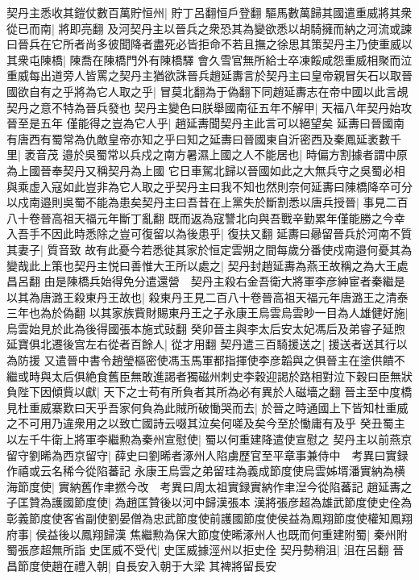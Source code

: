契丹主悉收其鎧仗數百萬貯恒州|{
	貯丁呂翻恒戶登翻}
驅馬數萬歸其國遣重威將其衆從已而南|{
	將即亮翻}
及河契丹主以晉兵之衆恐其為變欲悉以胡騎擁而納之河流或諫曰晉兵在它所者尚多彼聞降者盡死必皆拒命不若且撫之徐思其策契丹主乃使重威以其衆屯陳橋|{
	陳喬在陳橋門外有陳橋驛}
會久雪官無所給士卒凍餒咸怨重威相聚而泣重威每出道旁人皆罵之契丹主猶欲誅晉兵趙延夀言於契丹主曰皇帝親冒矢石以取晉國欲自有之乎將為它人取之乎|{
	冒莫北翻為于偽翻下同趙延夀志在帝中國以此言覘契丹之意不特為晉兵發也}
契丹主變色曰朕舉國南征五年不解甲|{
	天福八年契丹始攻晉至是五年}
僅能得之豈為它人乎|{
	趙延夀聞契丹主此言可以絕望矣}
延夀曰晉國南有唐西有蜀常為仇敵皇帝亦知之乎曰知之延夀曰晉國東自沂密西及秦鳳延袤數千里|{
	袤音茂}
邉於吳蜀常以兵戍之南方暑濕上國之人不能居也|{
	時偏方割據者謂中原為上國晉奉契丹又稱契丹為上國}
它日車駕北歸以晉國如此之大無兵守之吳蜀必相與乘虚入寇如此豈非為它人取之乎契丹主曰我不知也然則奈何延夀曰陳橋降卒可分以戍南邉則吳蜀不能為患矣契丹主曰吾昔在上黨失於斷割悉以唐兵授晉|{
	事見二百八十卷晉高祖天福元年斷丁亂翻}
既而返為寇讐北向與吾戰辛勤累年僅能勝之今幸入吾手不因此時悉除之豈可復留以為後患乎|{
	復扶又翻}
延夀曰曏留晉兵於河南不質其妻子|{
	質音致}
故有此憂今若悉徙其家於恒定雲朔之間每歲分番使戍南邉何憂其為變哉此上策也契丹主悦曰善惟大王所以處之|{
	契丹封趙延夀為燕王故稱之為大王處昌呂翻}
由是陳橋兵始得免分遣還營　契丹主殺右金吾衛大將軍李彦紳宦者秦繼是以其為唐潞王殺東丹王故也|{
	殺東丹王見二百八十卷晉高祖天福元年唐潞王之清泰三年也為於偽翻}
以其家族貲財賜東丹王之子永康王烏雲烏雲眇一目為人雄健好施|{
	烏雲始見於此為後得國張本施式䜴翻}
癸卯晉主與李太后安太妃馮后及弟睿子延煦延寶俱北遷後宫左右從者百餘人|{
	從才用翻}
契丹遣三百騎援送之|{
	援送者送其行以為防援}
又遣晉中書令趙瑩樞密使馮玉馬軍都指揮使李彦韜與之俱晉主在塗供饋不繼或時與太后俱絶食舊臣無敢進謁者獨磁州刺史李穀迎謁於路相對泣下穀曰臣無狀負陛下因傾貲以獻|{
	天下之士苟有所負者其所為必有異於人磁墻之翻}
晉主至中度橋見杜重威寨歎曰天乎吾家何負為此賊所破慟哭而去|{
	於晉之時通國上下皆知杜重威之不可用乃違衆用之以致亡國詩云啜其泣矣何嗟及矣今至於慟庸有及乎}
癸丑蜀主以左千牛衛上將軍李繼勲為秦州宣慰使|{
	蜀以何重建降遣使宣慰之}
契丹主以前燕京留守劉晞為西京留守|{
	薛史曰劉晞者涿州人陷虜歷官至平章事兼侍中　考異曰實録作禧或云名稀今從陷蕃記}
永康王烏雲之弟留珪為義成節度使烏雲姊壻潘實納為横海節度使|{
	實納舊作聿撚今改　考異曰周太祖實録實納作聿湼今從陷蕃記}
趙延夀之子匡贊為護國節度使|{
	為趙匡贊後以河中歸漢張本}
漢將張彦超為雄武節度使史佺為彰義節度使客省副使劉晏僧為忠武節度使前護國節度使侯益為鳳翔節度使權知鳳翔府事|{
	侯益後以鳳翔歸漢}
焦繼勲為保大節度使晞涿州人也既而何重建附蜀|{
	秦州附蜀張彦超無所詣}
史匡威不受代|{
	史匡威據涇州以拒史佺}
契丹勢稍沮|{
	沮在呂翻}
晉昌節度使趙在禮入朝|{
	自長安入朝于大梁}
其裨將留長安

